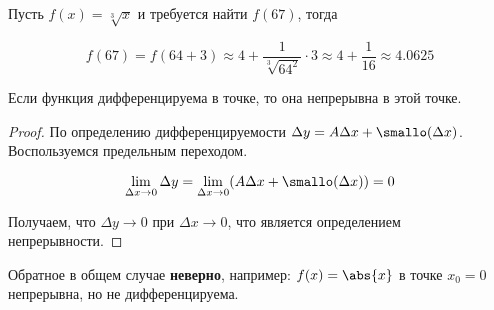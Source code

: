 \begin{example}
  Пусть \(f(x) = \sqrt[3]{x}\) и требуется найти \(f(67)\), тогда

  \begin{equation*}
    f(67)
    = f(64 + 3)
    \approx 4 + \frac{1}{\sqrt[3]{64^2}} \cdot 3
    \approx 4 + \frac{1}{16}
    \approx 4.0625
  \end{equation*}
\end{example}

\begin{theorem}
  Если функция дифференцируема в точке, то она непрерывна в этой точке.  
\end{theorem}

\begin{proof}
  По определению дифференцируемости \(\Delta y = A \Delta x + \smallo(\Delta
  x)\). Воспользуемся предельным переходом.

  \begin{equation*}
    \lim_{\Delta x \to 0} \Delta y
    = \lim_{\Delta x \to 0} (A \Delta x + \smallo(\Delta x))
    = 0    
  \end{equation*}

  Получаем, что \(\Delta y \to 0\) при \(\Delta x \to 0\), что является
  определением непрерывности.
\end{proof}

\begin{remark}
  Обратное в общем случае \textbf{неверно}, например: \(f(x) = \abs{x}\) в точке
  \(x_0 = 0\) непрерывна, но не дифференцируема.
\end{remark}
